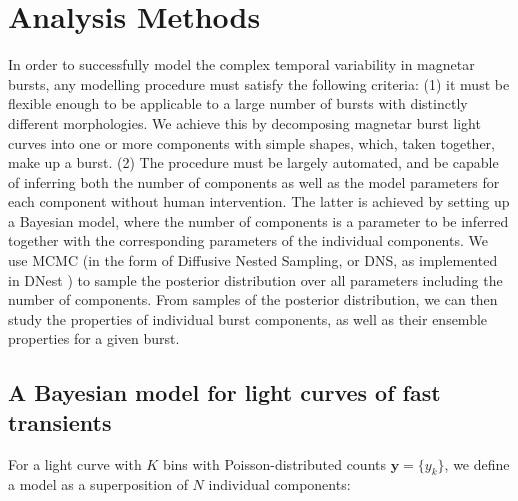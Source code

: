 \documentclass[12pt]{emulateapj}
\newcommand{\counts}{y}
\begin{document}
\section{Analysis Methods}
\label{ch6:methods}
In order to successfully model the complex temporal variability in magnetar bursts, any modelling procedure must satisfy the following criteria: (1) it must be flexible enough to be applicable to a large number of bursts with distinctly different morphologies. We achieve this by decomposing magnetar burst light curves into one or more components with simple shapes, which, taken together, make up a burst. (2) The procedure must be largely automated, and be capable of inferring both the number of components as well as the model parameters for each component without human intervention. The latter is achieved by setting up a Bayesian model, where the number of components is a parameter to be inferred together with the corresponding parameters of the individual components. We use MCMC (in the form of Diffusive Nested Sampling, or DNS, as implemented in DNest \citep{brewer2011}) to sample the posterior distribution over all parameters including the number of components. From samples of the posterior distribution,
we can then study the properties of individual burst components, as well as their ensemble properties for a given burst.

\subsection{A Bayesian model for light curves of fast transients}
\label{ch6:model}

For a light curve with $K$ bins with Poisson-distributed counts $\bm{\counts} = \{\counts_k\}$, we define a model as a superposition of $N$ individual components:
\end{document}

